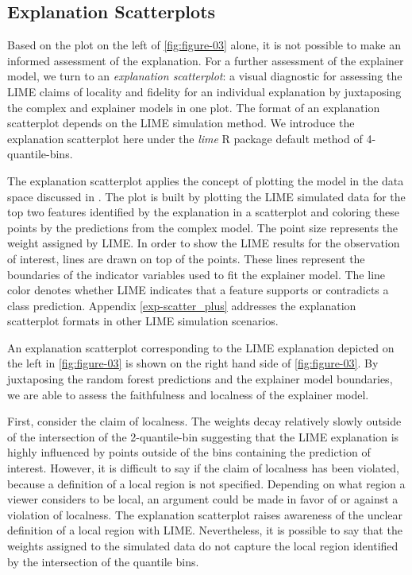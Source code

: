 \documentclass[AMS,STIX2COL]{WileyNJD-v2}\usepackage[]{graphicx}\usepackage[]{color}
\begin{document}
\subsection{Explanation Scatterplots} \label{exp-scatter}

Based on the plot on the left of \autoref{fig:figure-03} alone, it is not possible to make an informed assessment of the explanation. For a further assessment of the explainer model, we turn to an \emph{explanation scatterplot}: a visual diagnostic for assessing the LIME claims of locality and fidelity for an individual explanation by juxtaposing the complex and explainer models in one plot. The format of an explanation scatterplot depends on the LIME simulation method. We introduce the explanation scatterplot here under the \emph{lime} R package default method of 4-quantile-bins.

The explanation scatterplot applies the concept of plotting the model in the data space discussed in \citet{wickham:2015}. The plot is built by plotting the LIME simulated data for the top two features identified by the explanation in a scatterplot and coloring these points by the predictions from the complex model. The point size represents the weight assigned by LIME. In order to show the LIME results for the observation of interest, lines are drawn on top of the points. These lines  represent the boundaries of the indicator variables used to fit the explainer model. The line color  denotes whether LIME indicates that a feature supports or contradicts a class prediction. Appendix \ref{exp-scatter_plus} addresses the explanation scatterplot formats in other LIME simulation scenarios.

An explanation scatterplot corresponding to the LIME explanation depicted on the left in \autoref{fig:figure-03} is shown on the right hand side of \autoref{fig:figure-03}. By juxtaposing the random forest predictions and the explainer model boundaries, we are able to assess the faithfulness and localness of the explainer model. 

First, consider the claim of localness. The weights decay relatively slowly outside of the intersection of the 2-quantile-bin suggesting that the LIME explanation is highly influenced by points outside of the bins containing the prediction of interest. However, it is difficult to say if the claim of localness has been violated, because a definition of a local region is not specified. Depending on what region a viewer considers to be local, an argument could be made in favor of or against a violation of localness. The explanation scatterplot raises awareness of the unclear definition of a local region with LIME. Nevertheless, it is possible to say that the weights assigned to the simulated data do not capture  the local region identified by the intersection of the quantile bins. 
\end{document}
